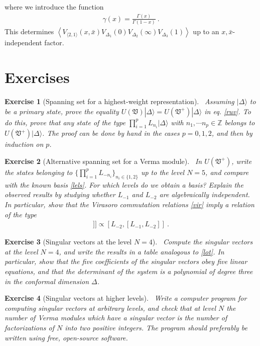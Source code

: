 \documentclass[12pt,a4paper,notitlepage]{report}
\numberwithin{equation}{section}
\theoremstyle{break}
\newtheorem{exo}{Exercise}[chapter]
\begin{document}
where we introduce the function
\begin{align}
 \gamma(x) = \frac{\Gamma(x)}{\Gamma(1-x)}\ .
\label{gx}
\end{align}
This determines $\left\langle V_{\langle 2,1 \rangle}(x,\bar{x})V_{\Delta_1}(0)V_{\Delta_2}(\infty)V_{\Delta_3}(1)\right\rangle$ up to an $x,\bar{x}$-independent factor. 


\section{Exercises}

\begin{exo}[Spanning set for a highest-weight representation]
 ~\label{exospan}
Assuming $|\Delta\rangle$ to be a primary state, prove the equality $U(\mathfrak{V})|\Delta\rangle =U(\mathfrak{V}^+)|\Delta\rangle$ in eq. \eqref{ruv}.
To do this, prove that any state of the type $\prod_{i=1}^p L_{n_i}|\Delta\rangle$ with $n_1,\cdots n_p\in {\mathbb{Z}}$ belongs to $U(\mathfrak{V}^+)|\Delta\rangle$.
The proof can be done by hand in the cases $p=0,1,2$, and then by induction on $p$.
\end{exo}

\begin{exo}[Alternative spanning set for a Verma module]
 ~\label{exoot}
In $U(\mathfrak{V}^+)$, write the states belonging to  $\{\prod_{i=1}^p L_{-n_i}\}_{n_i\in\{1,2\}}$ up to the level $N=5$, and compare with the known basis \eqref{lels}.
For which levels do we obtain a basis? Explain the observed results by studying whether $L_{-1}$ and $L_{-2}$ are algebraically independent.
In particular, show that the Virasoro commutation relations \eqref{vir} imply a relation of the type
\begin{align}
 [L_{-1},[L_{-1},[L_{-1},L_{-2}]]] \propto [L_{-2},[L_{-1},L_{-2}]]\ .
\end{align}
\end{exo}

\begin{exo}[Singular vectors at the level $N=4$]
~\label{exolf}
 Compute the singular vectors at the level $N=4$, and write the results in a table analogous to \eqref{lot}.
In particular, show that the five coefficients of the singular vectors obey five linear equations, and that the determinant of the system is a polynomial of degree three in the conformal dimension $\Delta$. 
\end{exo}

\begin{exo}[Singular vectors at higher levels]
~\label{exohl}
 Write a computer program for computing singular vectors at arbitrary levels, and check that at level $N$ the number of Verma modules which have a singular vector is the number of factorizations of $N$ into two positive integers.
The program should preferably be written using free, open-source software.
\end{exo}
\end{document}
